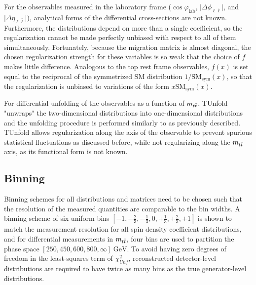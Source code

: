 For the observables measured in the laboratory frame ($\cos\varphi_{\mathrm{lab}}$, $\vert \Delta\phi_{\ell\bar{\ell}} \vert$, and $\vert \Delta\eta_{\ell\bar{\ell}} \vert$), analytical forms of the differential cross-sections are not known. 
Furthermore, the distributions depend on more than a single coefficient, so the regularization cannot be made perfectly unbiased with respect to all of them simultaneously. 
Fortunately, because the migration matrix is almost diagonal, the chosen regularization strength for these variables is so weak that the choice of $f$ makes little difference. 
Analogous to the top rest frame observables, $f(x)$ is set equal to the reciprocal of the symmetrized SM distribution $1/\mathrm{SM_{sym}}(x)$, so that the regularization is unbiased to variations of the form $x \mathrm{SM_{sym}}(x)$. 

For differential unfolding of the observables as a function of $m_{t\bar{t}}$, TUnfold "unwraps" the two-dimensional distributions into one-dimensional distributions and the unfolding procedure is performed similarly to as previously described. 
TUnfold allows regularization along the axis of the observable to prevent spurious statistical fluctuations as discussed before, while not regularizing along the $m_{t\bar{t}}$ axis, as its functional form is not known.


\subsection{Binning}
\label{Binning}
Binning schemes for all distributions and matrices need to be chosen such that the resolution of the measured quantities are comparable to the bin widths.
A binning scheme of six uniform bins $[-1,-\frac{2}{3},-\frac{1}{3},0,+\frac{1}{3},+\frac{2}{3},+1]$ is shown to match the measurement resolution for all spin density coefficient distributions, and for differential measurements in $m_{t\bar{t}}$, four bins are used to partition the phase space $[250,450,600,800,\infty] \; \si{\GeV}$.
To avoid having zero degrees of freedom in the least-squares term of $\chi^{2}_{Unf}$, reconstructed detector-level distributions are required to have twice as many bins as the true generator-level distributions.

